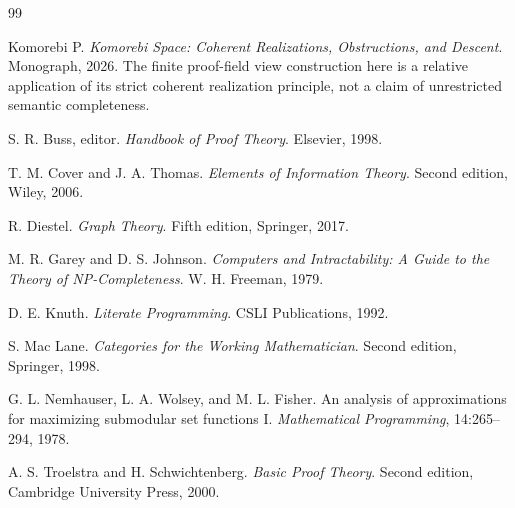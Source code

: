 \documentclass[11pt,oneside]{article}
\theoremstyle{definition}
\theoremstyle{remark}
\begin{document}
\begin{thebibliography}{99}

Komorebi P.
\textit{Komorebi Space: Coherent Realizations, Obstructions, and Descent}.
Monograph, 2026. The finite proof-field view construction here is a relative application of its strict coherent realization principle, not a claim of unrestricted semantic completeness.

S. R. Buss, editor.
\textit{Handbook of Proof Theory}.
Elsevier, 1998.

T. M. Cover and J. A. Thomas.
\textit{Elements of Information Theory}.
Second edition, Wiley, 2006.

R. Diestel.
\textit{Graph Theory}.
Fifth edition, Springer, 2017.

M. R. Garey and D. S. Johnson.
\textit{Computers and Intractability: A Guide to the Theory of NP-Completeness}.
W. H. Freeman, 1979.

D. E. Knuth.
\textit{Literate Programming}.
CSLI Publications, 1992.

S. Mac Lane.
\textit{Categories for the Working Mathematician}.
Second edition, Springer, 1998.

G. L. Nemhauser, L. A. Wolsey, and M. L. Fisher.
An analysis of approximations for maximizing submodular set functions I.
\textit{Mathematical Programming}, 14:265--294, 1978.

A. S. Troelstra and H. Schwichtenberg.
\textit{Basic Proof Theory}.
Second edition, Cambridge University Press, 2000.

\end{thebibliography}
\end{document}
